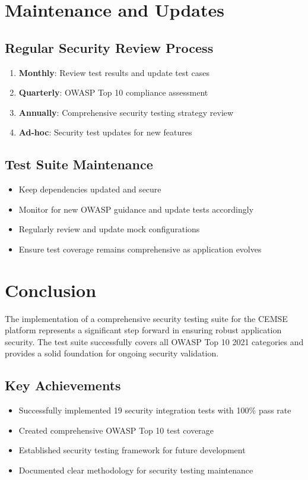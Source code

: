 \documentclass[12pt]{article}
\begin{document}
\section{Maintenance and Updates}

\subsection{Regular Security Review Process}

\begin{enumerate}
    \item \textbf{Monthly}: Review test results and update test cases
    \item \textbf{Quarterly}: OWASP Top 10 compliance assessment
    \item \textbf{Annually}: Comprehensive security testing strategy review
    \item \textbf{Ad-hoc}: Security test updates for new features
\end{enumerate}

\subsection{Test Suite Maintenance}

\begin{itemize}
    \item Keep dependencies updated and secure
    \item Monitor for new OWASP guidance and update tests accordingly
    \item Regularly review and update mock configurations
    \item Ensure test coverage remains comprehensive as application evolves
\end{itemize}

\section{Conclusion}

The implementation of a comprehensive security testing suite for the CEMSE platform represents a significant step forward in ensuring robust application security. The test suite successfully covers all OWASP Top 10 2021 categories and provides a solid foundation for ongoing security validation.

\subsection{Key Achievements}
\begin{itemize}
    \item Successfully implemented 19 security integration tests with 100\% pass rate
    \item Created comprehensive OWASP Top 10 test coverage
    \item Established security testing framework for future development
    \item Documented clear methodology for security testing maintenance
\end{itemize}
\end{document}
